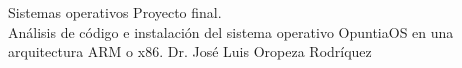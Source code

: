 



	\pnormal
	{Sistemas operativos}
	{Proyecto final. \\ Análisis de código e instalación del sistema operativo OpuntiaOS en una arquitectura ARM o x86.}
	{Dr. José Luis Oropeza Rodríquez}
	\tableofcontents
	
	
	\newpage 
	\newpage 
	\newpage 
	\clearpage
	\newpage  \clearpage
	\newpage 
	\newpage 
	\newpage 
	
	
	\newpage
	\renewcommand{\bibname}{Referencias}
	
	






